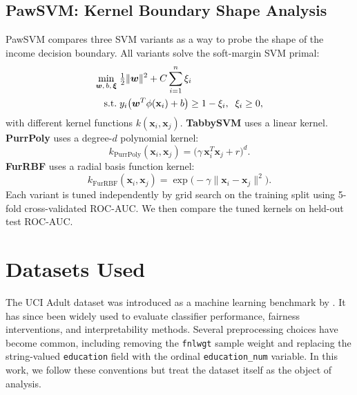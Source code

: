 \documentclass[11pt]{article}
\begin{document}
\subsection{PawSVM: Kernel Boundary Shape Analysis}
\label{sec:pawsvm}

PawSVM compares three SVM variants as a way to probe the shape of the income decision boundary. All variants solve the soft-margin SVM primal:
\begin{align}
  \min_{\boldsymbol{w},\, b,\, \boldsymbol{\xi}} &\;
    \tfrac{1}{2}\|\boldsymbol{w}\|^2 + C\sum_{i=1}^{n}\xi_i
    \label{eq:svm} \\
  \text{s.t.} &\;
    y_i\bigl(\boldsymbol{w}^T\phi(\mathbf{x}_i) + b\bigr) \geq 1 - \xi_i,\;\;
    \xi_i \geq 0, \notag
\end{align}
with different kernel functions $k(\mathbf{x}_i, \mathbf{x}_j)$. \textbf{TabbySVM} uses a linear kernel. \textbf{PurrPoly} uses a degree-$d$ polynomial kernel:
\begin{equation}
  k_{\text{PurrPoly}}(\mathbf{x}_i, \mathbf{x}_j)
  = \bigl(\gamma\, \mathbf{x}_i^T \mathbf{x}_j + r\bigr)^d.
  \label{eq:polykern}
\end{equation}
\textbf{FurRBF} uses a radial basis function kernel:
\begin{equation}
  k_{\text{FurRBF}}(\mathbf{x}_i, \mathbf{x}_j)
  = \exp\!\bigl(-\gamma \|\mathbf{x}_i - \mathbf{x}_j\|^2\bigr).
  \label{eq:rbfkern}
\end{equation}
Each variant is tuned independently by grid search on the training split using 5-fold cross-validated ROC-AUC. We then compare the tuned kernels on held-out test ROC-AUC.

\section{Datasets Used}
\label{sec:datasets}

The UCI Adult dataset was introduced as a machine learning benchmark by \citet{kohavi1996scaling}. It has since been widely used to evaluate classifier performance, fairness interventions, and interpretability methods. Several preprocessing choices have become common, including removing the \texttt{fnlwgt} sample weight and replacing the string-valued \texttt{education} field with the ordinal \texttt{education\_num} variable. In this work, we follow these conventions but treat the dataset itself as the object of analysis.
\end{document}
